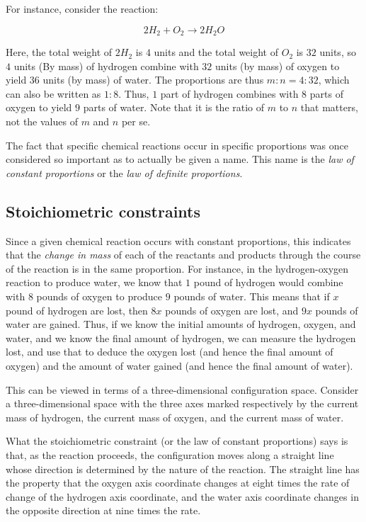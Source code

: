 \documentclass[10pt]{amsart}
\begin{document}
For instance, consider the reaction:

$$2H_2 + O_2 \to 2H_2O$$

Here, the total weight of $2H_2$ is $4$ units and the total weight of
$O_2$ is $32$ units, so $4$ units (By mass) of hydrogen combine with
$32$ units (by mass) of oxygen to yield $36$ units (by mass) of
water. The proportions are thus $m:n = 4:32$, which can also be
written as $1:8$. Thus, $1$ part of hydrogen combines with $8$ parts
of oxygen to yield $9$ parts of water. Note that it is the ratio of
$m$ to $n$ that matters, not the values of $m$ and $n$ per se.

The fact that specific chemical reactions occur in specific
proportions was once considered so important as to actually be given a
name. This name is the {\em law of constant proportions} or the {\em
law of definite proportions}.

\subsection{Stoichiometric constraints}

Since a given chemical reaction occurs with constant proportions, this
indicates that the {\em change in mass} of each of the reactants and
products through the course of the reaction is in the same
proportion. For instance, in the hydrogen-oxygen reaction to produce
water, we know that $1$ pound of hydrogen would combine with $8$
pounds of oxygen to produce $9$ pounds of water. This means that if
$x$ pound of hydrogen are lost, then $8x$ pounds of oxygen are lost,
and $9x$ pounds of water are gained. Thus, if we know the initial
amounts of hydrogen, oxygen, and water, and we know the final amount
of hydrogen, we can measure the hydrogen lost, and use that to deduce
the oxygen lost (and hence the final amount of oxygen) and the amount
of water gained (and hence the final amount of water).

This can be viewed in terms of a three-dimensional configuration
space. Consider a three-dimensional space with the three axes marked
respectively by the current mass of hydrogen, the current mass of
oxygen, and the current mass of water.

What the stoichiometric constraint (or the law of constant
proportions) says is that, as the reaction proceeds, the configuration
moves along a straight line whose direction is determined by the
nature of the reaction. The straight line has the property that the
oxygen axis coordinate changes at eight times the rate of change of
the hydrogen axis coordinate, and the water axis coordinate changes in
the opposite direction at nine times the rate.
\end{document}
